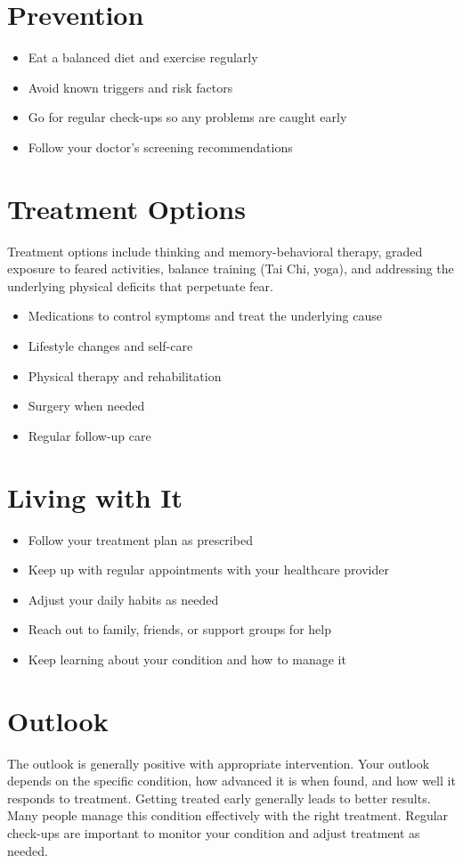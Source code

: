\section{Prevention}

\begin{itemize}[noitemsep]
  \item Eat a balanced diet and exercise regularly
  \item Avoid known triggers and risk factors
  \item Go for regular check-ups so any problems are caught early
  \item Follow your doctor's screening recommendations
\end{itemize}

\section{Treatment Options}
Treatment options include thinking and memory-behavioral therapy, graded exposure to feared activities, balance training (Tai Chi, yoga), and addressing the underlying physical deficits that perpetuate fear.

\begin{itemize}[noitemsep]
  \item Medications to control symptoms and treat the underlying cause
  \item Lifestyle changes and self-care
  \item Physical therapy and rehabilitation
  \item Surgery when needed
  \item Regular follow-up care
\end{itemize}

\section{Living with It}

\begin{itemize}[noitemsep]
  \item Follow your treatment plan as prescribed
  \item Keep up with regular appointments with your healthcare provider
  \item Adjust your daily habits as needed
  \item Reach out to family, friends, or support groups for help
  \item Keep learning about your condition and how to manage it
\end{itemize}

\section{Outlook}
The outlook is generally positive with appropriate intervention. Your outlook depends on the specific condition, how advanced it is when found, and how well it responds to treatment. Getting treated early generally leads to better results. Many people manage this condition effectively with the right treatment. Regular check-ups are important to monitor your condition and adjust treatment as needed.
